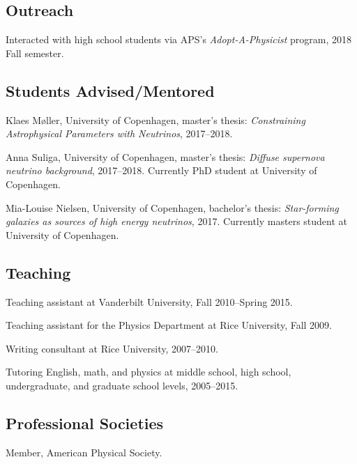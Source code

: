 \documentclass{article}
\renewenvironment{itemize}{
\begin{list}{}{
\setlength{\leftmargin}{.5em}}}{
\end{list}}
\begin{document}
\subsection*{Outreach}
\begin{itemize}
\item Interacted with high school students via APS's \emph{Adopt-A-Physicist} program, 2018 Fall semester.
\end{itemize}

\subsection*{Students Advised/Mentored}
\begin{itemize}
\item Klaes M\o ller, University of Copenhagen, master's thesis: \emph{Constraining Astrophysical Parameters with Neutrinos}, 2017--2018.
\item Anna Suliga, University of Copenhagen, master's thesis: \emph{Diffuse supernova neutrino background}, 2017--2018.
Currently PhD student at University of Copenhagen.
\item Mia-Louise Nielsen, University of Copenhagen, bachelor's thesis: \emph{Star-forming galaxies as sources of high energy neutrinos}, 2017.
Currently masters student at University of Copenhagen.
\end{itemize}

\subsection*{Teaching}
\begin{itemize}
\item Teaching assistant at Vanderbilt University, Fall 2010--Spring 2015.
\item Teaching assistant for the Physics Department at Rice University, Fall 2009.
\item Writing consultant at Rice University, 2007--2010.
\item Tutoring English, math, and physics at middle school, high school, undergraduate, and graduate school levels, 2005--2015.
\end{itemize}

\subsection*{Professional Societies}
\begin{itemize}
\item Member, American Physical Society.
\end{itemize}
\end{document}
